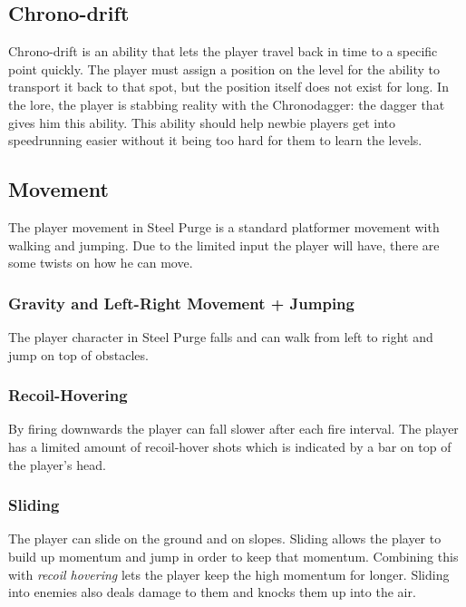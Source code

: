 \documentclass[12pt]{article}
\begin{document}
\subsection{Chrono-drift}

Chrono-drift is an ability that lets the player travel back in time to a specific point quickly. The player must assign a position on the level for the ability to transport it back to that spot, but the position itself does not exist for long. In the lore, the player is stabbing reality with the Chronodagger: the dagger that gives him this ability. This ability should help newbie players get into speedrunning easier without it being too hard for them to learn the levels.

\subsection{Movement}

The player movement in Steel Purge is a standard platformer movement with walking and jumping. Due to the limited input the player will have, there are some twists on how he can move.

\subsubsection{Gravity and Left-Right Movement + Jumping}

The player character in Steel Purge falls and can walk from left to right and jump on top of obstacles.

\subsubsection{Recoil-Hovering}

By firing downwards the player can fall slower after each fire interval. The player has a limited amount of recoil-hover shots which is indicated by a bar on top of the player's head. 

\subsubsection{Sliding}

The player can slide on the ground and on slopes. Sliding allows the player to build up momentum and jump in order to keep that momentum. Combining this with \emph{recoil hovering} lets the player keep the high momentum for longer. Sliding into enemies also deals damage to them and knocks them up into the air. 
\end{document}
